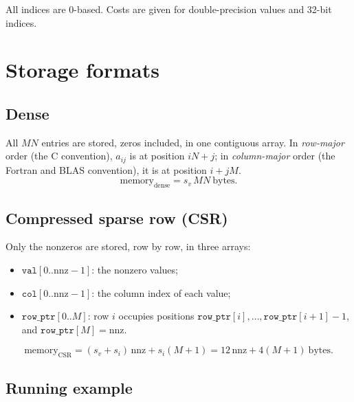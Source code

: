 \documentclass[11pt,a4paper]{article}
\newcommand{\id}[1]{\texttt{#1}}
\newcommand{\nnz}{\mathrm{nnz}}
\begin{document}
\noindent All indices are 0-based. Costs are given for double-precision values
and 32-bit indices.

\section{Storage formats}

\subsection{Dense}

All $MN$ entries are stored, zeros included, in one contiguous array.
In \emph{row-major} order (the C convention), $a_{ij}$ is at position
$iN + j$; in \emph{column-major} order (the Fortran and BLAS convention),
it is at position $i + jM$.
\[
  \text{memory}_{\text{dense}} = s_v\, M N \ \text{bytes}.
\]

\subsection{Compressed sparse row (CSR)}

Only the nonzeros are stored, row by row, in three arrays:
\begin{itemize}
  \item $\id{val}[0..\nnz-1]$: the nonzero values;
  \item $\id{col}[0..\nnz-1]$: the column index of each value;
  \item $\id{row\_ptr}[0..M]$: row $i$ occupies positions
        $\id{row\_ptr}[i], \dots, \id{row\_ptr}[i+1]-1$, and
        $\id{row\_ptr}[M] = \nnz$.
\end{itemize}
\[
  \text{memory}_{\text{CSR}} = (s_v + s_i)\,\nnz + s_i (M+1)
  = 12\,\nnz + 4(M+1) \ \text{bytes}.
\]

\subsection{Running example}
\end{document}
